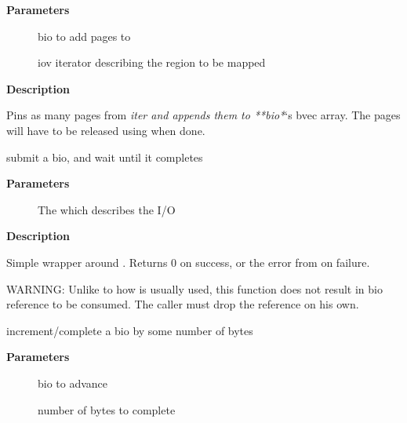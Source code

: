 \documentclass[a4paper,8pt,english]{sphinxmanual}
\begin{document}
\textbf{Parameters}
\begin{description}
\item[{}] \leavevmode
bio to add pages to

\item[{}] \leavevmode
iov iterator describing the region to be mapped

\end{description}

\textbf{Description}

Pins as many pages from \emph{iter and appends them to **bio*}`s bvec array. The
pages will have to be released using  when done.

\begin{fulllineitems}
\label{filesystems/index:c.submit_bio_wait}
submit a bio, and wait until it completes

\end{fulllineitems}


\textbf{Parameters}
\begin{description}
\item[{}] \leavevmode
The  which describes the I/O

\end{description}

\textbf{Description}

Simple wrapper around . Returns 0 on success, or the error from
{\hyperref[filesystems/index:c.bio_endio]{\emph{}}} on failure.

WARNING: Unlike to how  is usually used, this function does not
result in bio reference to be consumed. The caller must drop the reference
on his own.

\begin{fulllineitems}
\label{filesystems/index:c.bio_advance}
increment/complete a bio by some number of bytes

\end{fulllineitems}


\textbf{Parameters}
\begin{description}
\item[{}] \leavevmode
bio to advance

\item[{}] \leavevmode
number of bytes to complete

\end{description}
\end{document}
